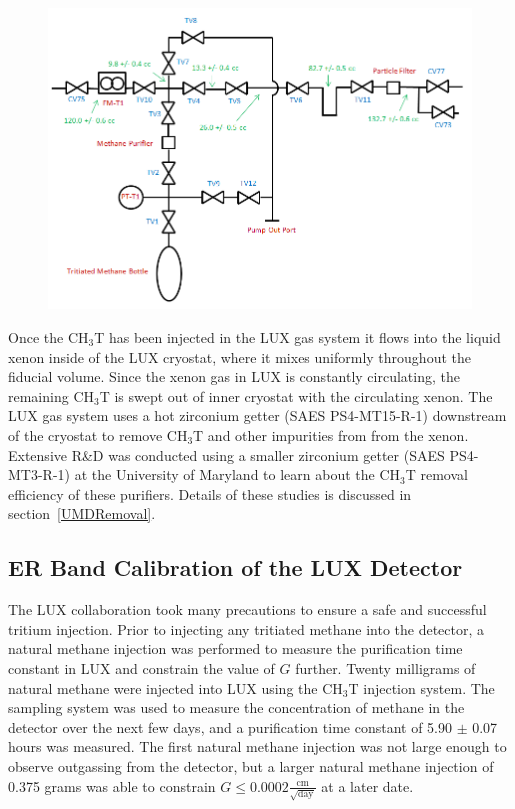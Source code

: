\begin{figure} [!h]
\includegraphics[scale=.6]{TritiumPlumbing.png} 
\label{LUXInjectionSys}
\end{figure}

Once the CH$_3$T has been injected in the LUX gas system it flows into the liquid xenon inside of the LUX cryostat, where it mixes uniformly throughout the fiducial volume.  Since the xenon gas in LUX is constantly circulating, the remaining CH$_3$T is swept out of inner cryostat with the circulating xenon.  The LUX gas system uses a hot zirconium getter (SAES PS4-MT15-R-1) downstream of the cryostat to remove CH$_3$T and other impurities from from the xenon. Extensive R\&D was conducted using a smaller zirconium getter (SAES PS4-MT3-R-1) at the University of Maryland to learn about the CH$_3$T removal efficiency of these purifiers. Details of these studies is discussed in section~\ref{UMDRemoval}.


\subsection{ER Band Calibration of the LUX Detector} \label{DiscrimSec}

The LUX collaboration took many precautions to ensure a safe and successful tritium injection. Prior to injecting any tritiated methane into the detector, a natural methane injection was performed to measure the purification time constant in LUX and constrain the value of $G$ further.   Twenty milligrams of natural methane were injected into LUX using the CH$_3$T injection system. The sampling system was used to measure the concentration of methane in the detector over the next few days, and a purification time constant of 5.90 $\pm$ 0.07 hours was measured.  The first natural methane injection was not large enough to observe outgassing from the detector, but a larger natural methane injection of 0.375 grams was able to constrain $G \le 0.0002 \frac{\text{cm}}{\sqrt{\text{day}}}$ at a later date.


